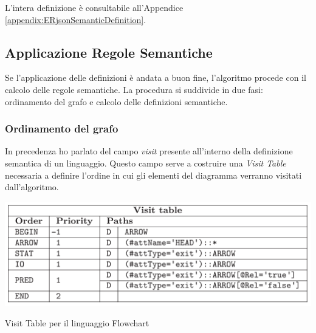                 L'intera definizione è consultabile all'Appendice \ref{appendix:ERjsonSemanticDefinition}.
                \newpage
                \begin{spacing}{0.5}
                    
                \end{spacing}

        \subsection{Applicazione Regole Semantiche}
            Se l'applicazione delle definizioni è andata a buon fine, l'algoritmo procede con il calcolo delle regole semantiche. La procedura si suddivide in due fasi: ordinamento del grafo e calcolo delle definizioni semantiche.

            \subsubsection{Ordinamento del grafo}
                In precedenza ho parlato del campo \textit{visit} presente all'interno della definizione semantica di un linguaggio. Questo campo serve a costruire una \textit{Visit Table} necessaria a definire l'ordine in cui gli elementi del diagramma verranno visitati dall'algoritmo.

                \begin{table}[htbp]
                    \centering
                    \includegraphics[scale=0.6]{Figure/visitTable.PNG}
                    \caption{Visit Table per il linguaggio Flowchart}
                    \label{tab:visitTable}
                \end{table}

